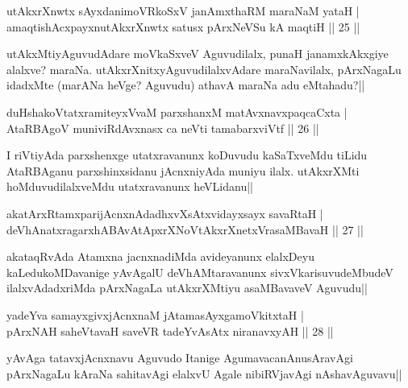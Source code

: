 
\begin{shl}
utAkxrXnwtx sAyxdanimoVRkoSxV janAmxthaRM maraNaM yataH |\\
amaqtishAcxpayxnutAkxrXnwtx satusx pArxNeVSu kA maqtiH \hfill || 25 ||
\end{shl}

\begin{artha}
utAkxMtiyAguvudAdare moVkaSxveV Aguvudilalx, punaH janamxkAkxgiye alalxve? maraNa. 
utAkxrXnitxyAguvudilalxvAdare maraNavilalx, pArxNagaLu idadxMte (marANa heVge? Aguvudu) 
athavA maraNa adu eMtahadu?||
\end{artha}

\begin{shl}
duHshakoVtatxramiteyxVvaM parxshanxM matAvx\s navxpaqcaCxta |\\
AtaRBAgoV muniviRdAvxnasx ca neVti tamabarxviVtf \hfill || 26 ||
\end{shl}

\begin{artha}
I riVtiyAda parxshenxge utatxravanunx koDuvudu kaSaTxveMdu tiLidu AtaRBAganu 
parxshinxsidanu jAcnxniyAda muniyu ilalx. utAkxrXMti hoMduvudilalxveMdu utatxravanunx 
heVLidanu||
\end{artha}

\begin{shl}
akatArxRtamxparijAcnxnAdadhxvXsAtxvidayxsayx savaRtaH |\\
deVhAnatxragarxhABAvAtApxrXNoVtAkxrXnetxVrasaMBavaH \hfill || 27 ||
\end{shl}

\begin{artha}
akataqRvAda Atamxna jacnxnadiMda avideyanunx elalxDeyu kaLedukoMDavanige yAvAgalU deVhAMtaravanunx sivxVkarisuvudeMbudeV ilalxvAdadxriMda pArxNagaLa utAkxrXMtiyu asaMBavaveV Aguvudu||
\end{artha}

\begin{shl}
yadeYva samayxgivxjAcnxnaM jAtamasAyx\s \s gamoVkitxtaH |\\
pArxNAH saheVtavaH saveVR tadeYvAsAtx niranavxyAH \hfill || 28 ||
\end{shl}

\begin{artha}
yAvAga tatavxjAcnxnavu Aguvudo Itanige AgumavacanAnusAravAgi pArxNagaLu kAraNa sahitavAgi elalxvU Agale nibiRVjavAgi nAshavAguvavu||
\end{artha}


